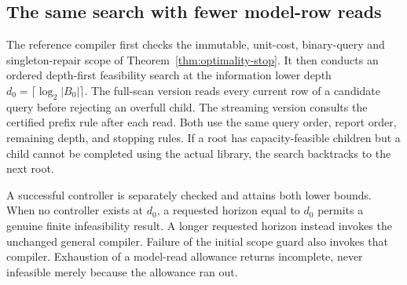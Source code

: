 \documentclass[11pt,letterpaper]{article}
\theoremstyle{plain}
\theoremstyle{definition}
\begin{document}
\subsection{The same search with fewer model-row reads}
The reference compiler first checks the immutable, unit-cost, binary-query and singleton-repair scope of Theorem~\ref{thm:optimality-stop}. It then conducts an ordered depth-first feasibility search at the information lower depth $d_0=\lceil\log_2|B_0|\rceil$. The full-scan version reads every current row of a candidate query before rejecting an overfull child. The streaming version consults the certified prefix rule after each read. Both use the same query order, report order, remaining depth, and stopping rules. If a root has capacity-feasible children but a child cannot be completed using the actual library, the search backtracks to the next root.

A successful controller is separately checked and attains both lower bounds. When no controller exists at $d_0$, a requested horizon equal to $d_0$ permits a genuine finite infeasibility result. A longer requested horizon instead invokes the unchanged general compiler. Failure of the initial scope guard also invokes that compiler. Exhaustion of a model-read allowance returns incomplete, never infeasible merely because the allowance ran out.
\end{document}
